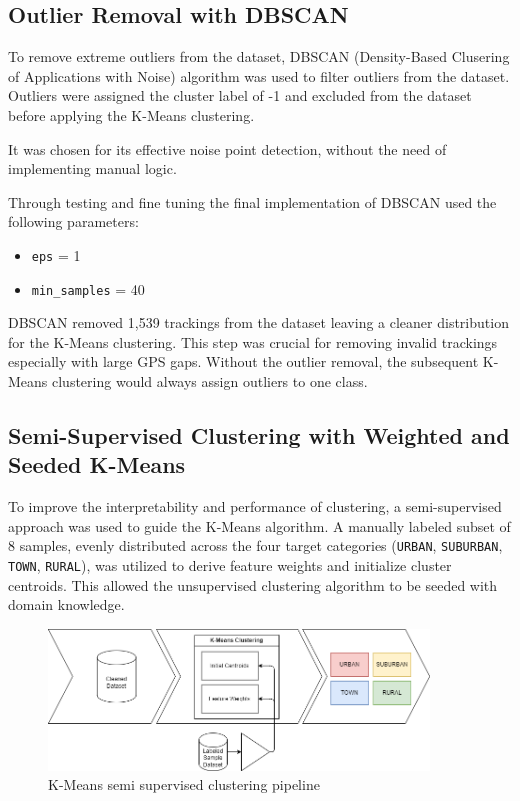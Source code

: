 \documentclass[a4paper,12pt,twoside]{scrreprt}
\begin{document}
\subsection{Outlier Removal with DBSCAN}
To remove extreme outliers from the dataset, DBSCAN (Density-Based Clusering
of Applications with Noise) algorithm was used to filter outliers from the
dataset.
Outliers were assigned the cluster label of -1 and excluded from the dataset
before applying the K-Means clustering.

It was chosen for its effective noise point detection, without the need of
implementing manual logic.

Through testing and fine tuning the final implementation of DBSCAN used the
following parameters:
\begin{itemize}
  \item \texttt{eps} = 1
  \item \texttt{min\_samples} = 40
\end{itemize}

DBSCAN removed 1,539 trackings from the dataset leaving a cleaner distribution
for the K-Means clustering.
This step was crucial for removing invalid trackings especially with large GPS
gaps. Without the outlier removal, the subsequent K-Means clustering would
always assign
outliers to one class.

\subsection{Semi-Supervised Clustering with Weighted and Seeded K-Means}


To improve the interpretability and performance of clustering, a
semi-supervised approach was used to guide the K-Means algorithm. A manually
labeled subset of 8 samples, evenly distributed across the four target
categories (\texttt{URBAN}, \texttt{SUBURBAN}, \texttt{TOWN}, \texttt{RURAL}),
was utilized to derive feature weights and initialize cluster centroids. This
allowed the unsupervised clustering algorithm to be seeded with domain
knowledge.

\begin{figure}[htbp]
  \centering

  \includegraphics[width=0.9\textwidth]{Diagrams/drawio/implementation/clustering_pipeline.png}
  \caption{K-Means semi supervised clustering pipeline}
  \label{fig:kmeans-clustering-pipline}
\end{figure}
\FloatBarrier
\end{document}
